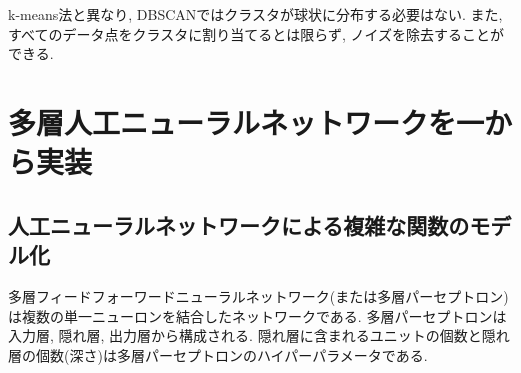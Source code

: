 \documentclass[uplatex]{jsarticle}
\theoremstyle{definition}
\numberwithin{equation}{section}
\begin{document}
k-means法と異なり, DBSCANではクラスタが球状に分布する必要はない.
また, すべてのデータ点をクラスタに割り当てるとは限らず, ノイズを除去することができる.


\section{多層人工ニューラルネットワークを一から実装}
\subsection{人工ニューラルネットワークによる複雑な関数のモデル化}
多層フィードフォーワードニューラルネットワーク(または多層パーセプトロン)は複数の単一ニューロンを結合したネットワークである.
多層パーセプトロンは入力層, 隠れ層, 出力層から構成される.
隠れ層に含まれるユニットの個数と隠れ層の個数(深さ)は多層パーセプトロンのハイパーパラメータである.
\end{document}

